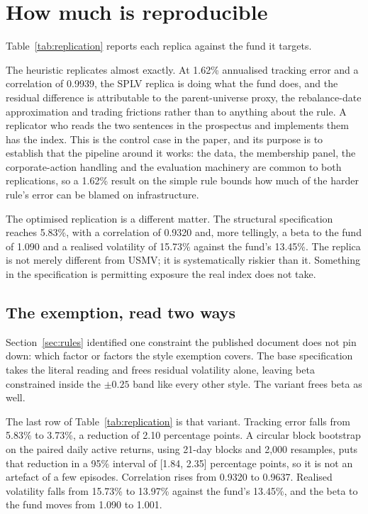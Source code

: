 \section{How much is reproducible}
\label{sec:repro}
Table~\ref{tab:replication} reports each replica against the fund it targets.



The heuristic replicates almost exactly. At 1.62\% annualised tracking error
and a correlation of 0.9939, the SPLV replica is doing what the fund does, and
the residual difference is attributable to the parent-universe proxy, the
rebalance-date approximation and trading frictions rather than to anything
about the rule. A replicator who reads the two sentences in the prospectus and
implements them has the index. This is the control case in the paper, and its
purpose is to establish that the pipeline around it works: the data, the
membership panel, the corporate-action handling and the evaluation machinery
are common to both replications, so a 1.62\% result on the simple rule bounds
how much of the harder rule's error can be blamed on infrastructure.

The optimised replication is a different matter. The structural specification
reaches 5.83\%, with a correlation of 0.9320 and, more tellingly, a beta to the
fund of 1.090 and a realised volatility of 15.73\% against the fund's 13.45\%.
The replica is not merely different from USMV; it is systematically riskier
than it. Something in the specification is permitting exposure the real index
does not take.

\subsection{The exemption, read two ways}
Section~\ref{sec:rules} identified one constraint the published document does
not pin down: which factor or factors the style exemption covers. The base
specification takes the literal reading and frees residual volatility alone,
leaving beta constrained inside the $\pm0.25$ band like every other style. The
variant frees beta as well.

The last row of Table~\ref{tab:replication} is that variant. Tracking error
falls from 5.83\% to 3.73\%, a reduction of 2.10 percentage points. A circular
block bootstrap on the paired daily active returns, using 21-day blocks and
2{,}000 resamples, puts that reduction in a 95\% interval of [1.84, 2.35]
percentage points, so it is not an artefact of a few episodes. Correlation
rises from 0.9320 to 0.9637. Realised volatility falls from 15.73\% to 13.97\%
against the fund's 13.45\%, and the beta to the fund moves from 1.090 to 1.001.

